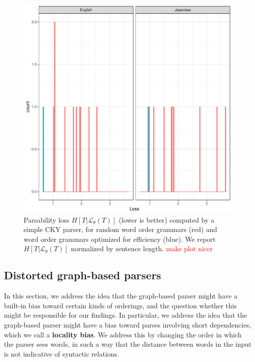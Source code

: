 \documentclass[10pt,twoside,lineno]{article}
\newcommand{\key}[1]{\textbf{#1}}
\begin{document}
\begin{figure}
    \centering
    \includegraphics[scale=.7]{../results/cky/cky-parse.pdf} 
	\caption{Parsability loss $H[T|\mathcal{L}_\theta(T)]$ (lower is better) computed by a simple CKY parser, for random word order grammars (red) and word order grammars optimized for efficiency (blue). We report $H[T|\mathcal{L}_\theta(T)]$ normalized by sentence length. \textcolor{red}{make plot nicer}}
    \label{fig:cky-parser}
\end{figure}



\subsection{Distorted graph-based parsers}

In this section, we address the idea that the graph-based parser might have a built-in bias toward certain kinds of orderings, and the question whether this might be responsible for our findings.
In particular, we address the idea that the graph-based parser might have a bias toward parses involving short dependencies, which we call a \key{locality bias}. 
We address this by changing the order in which the parser sees words, in such a way that the distance between words in the input is not indicative of syntactic relations.
\end{document}
